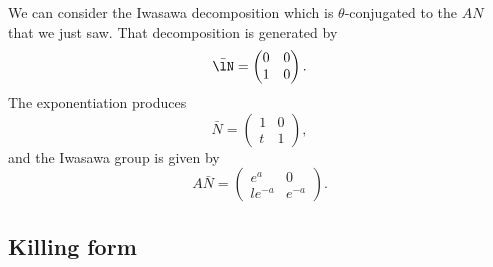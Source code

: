 We can consider the Iwasawa decomposition which is $\theta$-conjugated to the $AN$ that we just saw. That decomposition is generated by
\begin{equation}
	\bar\lN=\begin{pmatrix}
		0 & 0 \\
		1 & 0
	\end{pmatrix}.
\end{equation}
The exponentiation produces
\begin{equation}
	\bar N=\begin{pmatrix}
		1 & 0 \\
		t & 1
	\end{pmatrix},
\end{equation}
and the Iwasawa group is given by
\begin{equation}        \label{EqGeneANbarSLdeuxR}
	A\bar N=\begin{pmatrix}
		e^a      & 0      \\
		l e^{-a} & e^{-a}
	\end{pmatrix}.
\end{equation}

\subsection{Killing form}

